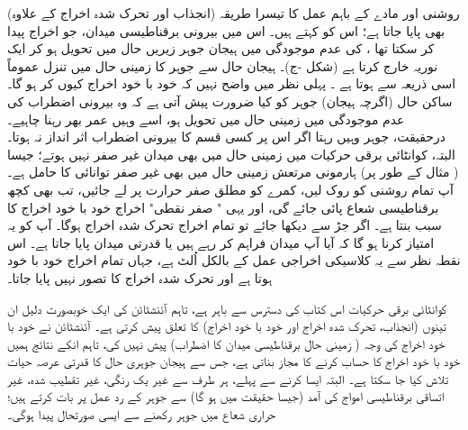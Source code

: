(انجذاب اور تحرک شدہ  اخراج کے  علاوہ)  روشنی اور مادے کے  باہم عمل کا  تیسرا طریقہ بھی پایا جاتا ہے؛ اس کو   کہتے ہیں۔ اس میں  بیرونی برقناطیسی میدان،  جو اخراج پیدا کر سکتا تھا ،  کی عدم موجودگی میں ہیجان جوہر زیریں حال میں تحویل  ہو کر ایک نوریہ خارج کرتا ہے  (شکل -ج)۔ 	ہیجان حال سے   جوہر کا زمینی حال میں تنزل عموماً اسی ذریعہ  سے ہوتا ہے ۔ پہلی نظر میں  واضح  نہیں کہ خود با خود اخراج کیوں کر ہو گا۔  ساکن حال  (اگرچہ ہیجان)  جوہر کو کیا ضرورت پیش آتی ہے کہ وہ بیرونی اضطراب کی عدم موجودگی میں زمینی حال میں   تحویل  ہو، اسے وہیں عمر بھر رہنا چاہیے۔ درحقیقت،  جوہر وہیں رہتا اگر اس پر کسی قسم کا بیرونی اضطراب اثر انداز نہ ہوتا۔ البتہ،   کوانٹائی برقی حرکیات میں زمینی حال میں بھی میدان غیر صفر نہیں  ہوتے؛  جیسا ( مثال کے طور پر)   ہارمونی مرتعش زمینی حال میں بھی غیر صفر توانائی  کا حامل ہے۔ آپ تمام روشنی کو روک لیں،  کمرے  کو مطلق صفر حرارت پر لے جائیں، تب بھی کچھ  برقناطیسی شعاع پائی جائے گی، اور یہی " صفر نقطی"  اخراج خود با خود اخراج کا سبب بنتا ہے۔ اگر جڑ سے دیکھا جائے تو  تمام اخراج تحرک شدہ اخراج ہوگا۔ آپ کو یہ امتیاز کرنا ہو گا کہ آیا آپ  میدان  فراہم کر رہے ہیں  یا قدرتی میدان پایا جاتا ہے۔ اس نقطہ نظر سے یہ کلاسیکی اخراجی عمل کے بالکل اُلٹ ہے، جہاں تمام اخراج خود با خود ہوتا ہے اور تحرک شدہ اخراج کا تصور نہیں پایا جاتا۔

کوانٹائی برقی حرکیات اس کتاب کی   دسترس  سے باہر ہے،   تاہم آئنشٹائن کی ایک خوبصورت دلیل ان تینوں (انجذاب،   تحرک شدہ اخراج اور خود با خود اخراج)  کا تعلق پیش کرتی ہے۔ آئنشٹائن نے خود با خود اخراج کی وجہ ( زمینی حال برقناطیسی میدان کا اضطراب)  پیش نہیں کی،  تاہم انکے نتائج ہمیں خود با خود اخراج کا حساب کرنے کا مجاز بناتی ہے، جس سے ہیجان جوہری حال کا  قدرتی عرصہ حیات تلاش کیا جا سکتا ہے۔ البتہ   ایسا کرنے سے پہلے، ہر طرف سے غیر یک رنگی، غیر تقطیب شدہ، غیر اتساقی  برقناطیسی امواج کی آمد  (جیسا حقیقت میں ہو گا) سے جوہر کے رد عمل پر بات کرتے ہیں؛  حراری شعاع میں جوہر رکھنے سے ایسی صورتحال پیدا ہوگی۔

